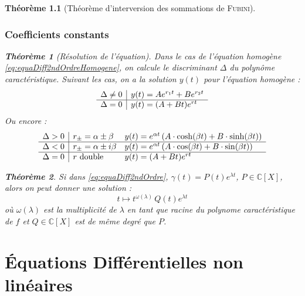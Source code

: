\documentclass[11pt,a4paper]{report}
\newtheorem{theorem}{Théorème}[chapter]
\newtheorem{itheorem}[theorem]{Théorème}
\theoremstyle{definition}
\begin{document}
\begin{theorem}[Théorème d'interversion des sommations de \textsc{Fubini}]
{{\subsection{Coefficients constants}
\begin{itheorem}[Résolution de l'équation]
Dans le cas de l'équation homogène \eqref{eq:equaDiff2ndOrdreHomogene}, on calcule le discriminant $\Delta$ du polynôme caractéristique. Suivant les cas, on a la solution $y(t)$ pour \emph{l'équation homogène} : 
\[
\begin{array}{r | l}
\Delta \neq 0 & y(t) = A e^{r_1t}+B e^{r_2t}\\
\hline
\Delta = 0 & y(t) = (A+Bt)e^{rt}
\end{array}
\]
Ou encore : 
\[
\begin{array}{r | l l}
\Delta > 0 & r_{\pm}=\alpha \pm \beta &y(t) = e^{\alpha t}\left( A\cdot \cosh(\beta t) + B\cdot \sinh (\beta t) \right)
\\
\hline
\Delta < 0 & r_{\pm}=\alpha \pm i\beta &y(t) = e^{\alpha t}\left( A\cdot \cos(\beta t) + B\cdot \sin (\beta t) \right)
\\
\hline
\Delta = 0 & r \text{ double}& y(t) = (A+Bt)e^{rt}
\end{array}
\]
\end{itheorem}
\begin{theorem}
    Si dans \eqref{eq:equaDiff2ndOrdre}, $\gamma (t)= P(t)e^{\lambda t}$, $P\in \ensuremath{\mathbb{C}} [X]$, alors on peut donner une solution :
    \begin{equation}
    t \mapsto t^{\omega(\lambda)}\, Q(t)e^{\lambda t}
    \end{equation}
    où $\omega(\lambda )$ est la multiplicité de $\lambda$ en tant que racine du polynome caractéristique de $f$ et $Q \in \ensuremath{\mathbb{C}}[X]$ est de même degré que $P$.
\end{theorem}
\chapter{Équations Différentielles non linéaires}
}}
\end{theorem}
\end{document}
